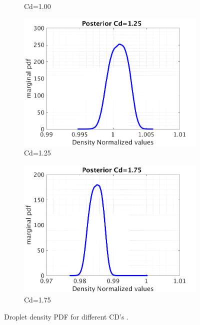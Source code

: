 \documentclass{article}
\begin{document}
\begin{figure}[H]
\begin{center}
\begin{subfigure}{0.4\textwidth}
    \caption{\centering Cd=1.00}
  \end{subfigure}
  \begin{subfigure}{0.4\textwidth}
    \centering\includegraphics[width=1.1\textwidth,keepaspectratio]{images/inverse_problem/infer_radius/drag_125/range_short/densityraw_PDF.png}
    \caption{\centering Cd=1.25}
  \end{subfigure}
  \begin{subfigure}{0.4\textwidth}
    \centering\includegraphics[width=1.1\textwidth,keepaspectratio]{images/inverse_problem/infer_radius/drag_175/densityraw_PDF.png}
    \caption{\centering Cd=1.75}
  \end{subfigure}

\caption{Droplet density PDF for different CD's .}
\label{fig:first_compilation} 
 \end{center}
\end{figure}
\end{document}

